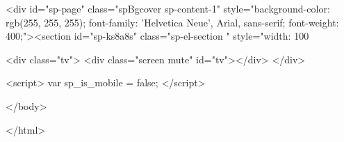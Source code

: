 	
			<div id="sp-page" class="spBgcover sp-content-1" style="background-color: rgb(255, 255, 255); font-family: 'Helvetica Neue', Arial, sans-serif; font-weight: 400;"><section id="sp-ks8a8s" class="sp-el-section " style="width: 100%


<div class="tv">
	<div class="screen mute" id="tv"></div>
</div>

	
<script>
	var sp_is_mobile = false;	
</script>

		</body>

</html>

	